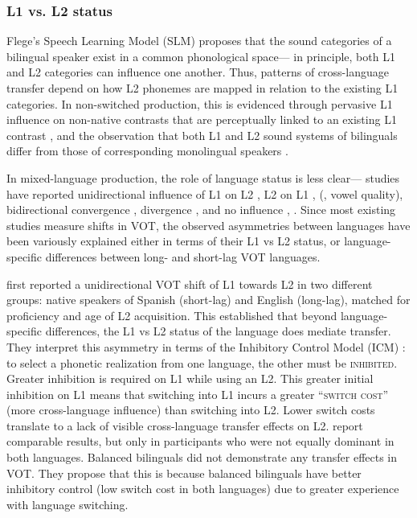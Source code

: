 \documentclass[12 pt]{article}
\begin{document}
\subsubsection*{L1 vs. L2 status} 
Flege's Speech Learning Model (SLM) \citeyearpar[][]{flege1995second,flege2007language} proposes that the sound categories of a bilingual speaker exist in a common phonological space--- in principle, both L1 and L2 categories can influence one another. Thus, patterns of cross-language transfer depend on how L2 phonemes are mapped in relation to the existing L1 categories. In non-switched production, this is evidenced through pervasive L1 influence on non-native contrasts that are perceptually linked to an existing L1 contrast \citep[see equivalence classification:][]{flege1984limits,flege1987production}, and the observation that both L1 and L2 sound systems of bilinguals differ from those of corresponding monolingual speakers \citep[e.g.][vowel quality]{guion2003vowel}. 

In mixed-language production, the role of language status is less clear--- studies have reported unidirectional influence of L1 on L2 \citep[][VOT]{balukas2015spanish,antoniou2011inter,vsimavckova2015immediate,goldrick2014language}, L2 on L1 \citep[][VOT]{tsui2019impact, olson2013bilingual}, (\cite{elias2017effects}, vowel quality), bidirectional convergence \citep[][VOT]{bullock2009trying, olson2016role}, divergence \citep[][VOT]{bullock2009trying,vsimavckova2018patterns}, and no influence \citep[][vowel quality]{muldner2019phonetics}, \citep[][phonological process]{schwartz2015language}. Since most existing studies measure shifts in VOT, the observed asymmetries between languages have been variously explained either in terms of their L1 vs L2 status, or language-specific differences between long- and short-lag VOT languages. %

\cite{olson2013bilingual} first reported a unidirectional VOT shift of L1 towards L2 in two different groups: native speakers of Spanish (short-lag) and English (long-lag), matched for proficiency and age of L2 acquisition. This established that beyond language-specific differences, the L1 vs L2 status of the language does mediate transfer. They interpret this asymmetry in terms of the Inhibitory Control Model (ICM) \citep{green1998mental}: to select a phonetic realization from one language, the other must be \textsc{inhibited}. Greater inhibition is required on L1 while using an L2. This greater initial inhibition on L1 means that switching into L1 incurs a greater \textsc{``switch cost''} (more cross-language influence) than switching into L2. Lower switch costs translate to a lack of visible cross-language transfer effects on L2. \cite{tsui2019impact} report comparable results, but only in participants who were not equally dominant in both languages. Balanced bilinguals did not demonstrate any transfer effects in VOT. They propose that this is because balanced bilinguals have better inhibitory control (low switch cost in both languages) due to greater experience with language switching.
\end{document}
